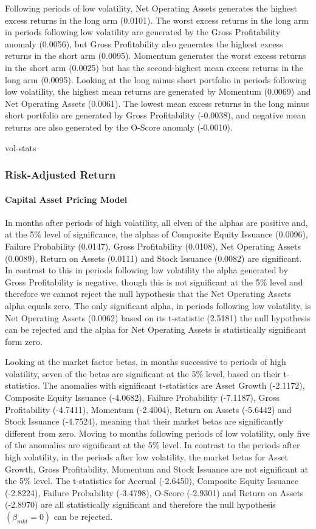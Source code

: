 \documentclass[a4paper,12pt]{article}                 %
\begin{document}
Following periods of low volatility, Net Operating Assets generates the highest excess returns in the long arm (0.0101). The worst excess returns in the long arm in periods following low volatility are generated by the Gross Profitability anomaly (0.0056), but Gross Profitability also generates the highest excess returns in the short arm (0.0095).  Momentum generates the worst excess returns in the short arm (0.0025) but has the second-highest mean excess returns in the long arm (0.0095). Looking at the long minus short portfolio in periods following low volatility, the highest mean returns are generated by Momentum (0.0069) and Net Operating Assets (0.0061). The lowest mean excess returns in the long minus short portfolio are generated by Gross Profitability (-0.0038), and negative mean returns are also generated by the O-Score anomaly (-0.0010).

{vol-stats}

\subsubsection{Risk-Adjusted Return}
\paragraph{Capital Asset Pricing Model}
In months after periods of high volatility, all elven of the alphas are positive and, at the 5\% level of significance, the alphas of Composite Equity Issuance (0.0096), Failure Probability (0.0147), Gross Profitability (0.0108), Net Operating Assets (0.0089), Return on Assets (0.0111) and Stock Issuance (0.0082) are significant. In contrast to this in periods following low volatility the alpha generated by Gross Profitability is negative, though this is not significant at the 5\% level and therefore we cannot reject the null hypothesis that the Net Operating Assets alpha equals zero. The only significant alpha, in periods following low volatility, is Net Operating Assets (0.0062) based on its t-statistic (2.5181) the null hypothesis can be rejected and the alpha for Net Operating Assets is statistically significant form zero. 

Looking at the market factor betas, in months successive to periods of high volatility, seven of the betas are significant at the 5\% level, based on their t-statistics. The anomalies with significant t-statistics are Asset Growth (-2.1172), Composite Equity Issuance (-4.0682), Failure Probability (-7.1187), Gross Profitability (-4.7411), Momentum (-2.4004), Return on Assets (-5.6442) and Stock Issuance (-4.7524), meaning that their market betas are significantly different from zero. Moving to months following periods of low volatility, only five of the anomalies are significant at the 5\% level. In contrast to the periods after high volatility, in the periods after low volatility, the market betas for Asset Growth, Gross Profitability, Momentum and Stock Issuance are not significant at the 5\% level. The t-statistics for Accrual (-2.6450), Composite Equity Issuance (-2.8224), Failure Probability (-3.4798), O-Score (-2.9301) and Return on Assets (-2.8970) are all statistically significant and therefore the null hypothesis $(\beta_{mkt}= 0)$ can be rejected.
\end{document}
